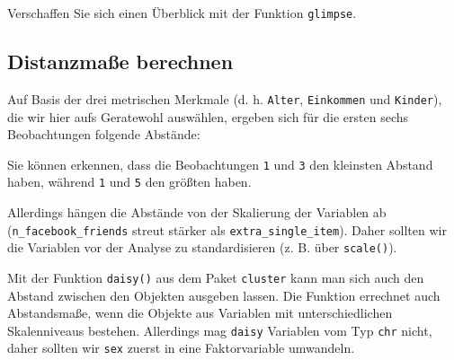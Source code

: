 \documentclass[12pt,ngerman,]{book}
\makeatletter
\newenvironment{Shaded}{\begin{snugshade}}{\end{snugshade}}
\newcommand{\KeywordTok}[1]{\textcolor[rgb]{0.13,0.29,0.53}{\textbf{#1}}}
\newcommand{\DataTypeTok}[1]{\textcolor[rgb]{0.13,0.29,0.53}{#1}}
\newcommand{\StringTok}[1]{\textcolor[rgb]{0.31,0.60,0.02}{#1}}
\newcommand{\CommentTok}[1]{\textcolor[rgb]{0.56,0.35,0.01}{\textit{#1}}}
\newcommand{\OperatorTok}[1]{\textcolor[rgb]{0.81,0.36,0.00}{\textbf{#1}}}
\newcommand{\NormalTok}[1]{#1}
\newenvironment{kframe}{%
\medskip{}
\setlength{\fboxsep}{.8em}
 \def\at@end@of@kframe{}%
 \ifinner\ifhmode%
  \def\at@end@of@kframe{\end{minipage}}%
  \begin{minipage}{\columnwidth}%
 \fi\fi%
 \def\FrameCommand##1{\hskip\@totalleftmargin \hskip-\fboxsep
 \colorbox{shadecolor}{##1}\hskip-\fboxsep
     \hskip-\linewidth \hskip-\@totalleftmargin \hskip\columnwidth}%
 \MakeFramed {\advance\hsize-\width
   \@totalleftmargin\z@ \linewidth\hsize
   \@setminipage}}%
 {\par\unskip\endMakeFramed%
 \at@end@of@kframe}
\renewenvironment{Shaded}{\begin{kframe}}{\end{kframe}}
\theoremstyle{definition}
\theoremstyle{definition}
\theoremstyle{remark}
\makeatother
\begin{document}
Verschaffen Sie sich einen Überblick mit der Funktion \texttt{glimpse}.

\subsection{Distanzmaße berechnen}\label{distanzmae-berechnen}

Auf Basis der drei metrischen Merkmale (d. h. \texttt{Alter},
\texttt{Einkommen} und \texttt{Kinder}), die wir hier aufs Geratewohl
auswählen, ergeben sich für die ersten sechs Beobachtungen folgende
Abstände:

\begin{Shaded}
\end{Shaded}

Sie können erkennen, dass die Beobachtungen \texttt{1} und \texttt{3}
den kleinsten Abstand haben, während \texttt{1} und \texttt{5} den
größten haben.

Allerdings hängen die Abstände von der Skalierung der Variablen ab
(\texttt{n\_facebook\_friends} streut stärker als
\texttt{extra\_single\_item}). Daher sollten wir die Variablen vor der
Analyse zu standardisieren (z. B. über \texttt{scale()}).

Mit der Funktion \texttt{daisy()} aus dem Paket \texttt{cluster} kann
man sich auch den Abstand zwischen den Objekten ausgeben lassen. Die
Funktion errechnet auch Abstandsmaße, wenn die Objekte aus Variablen mit
unterschiedlichen Skalenniveaus bestehen. Allerdings mag \texttt{daisy}
Variablen vom Typ \texttt{chr} nicht, daher sollten wir \texttt{sex}
zuerst in eine Faktorvariable umwandeln.

\begin{Shaded}
\end{Shaded}
\end{document}
